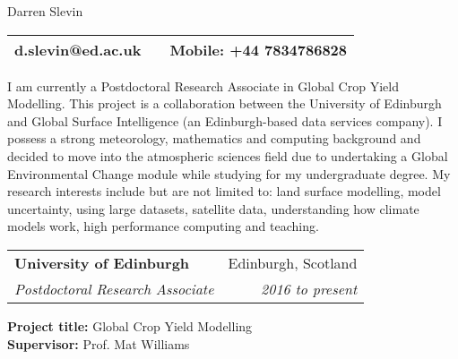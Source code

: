 \documentclass[11pt]{article}
\makeatletter
\newenvironment{newparagraph}{\par\setlength{\rightskip}{3cm}}
\newcommand{\resumeSection}[1]{
    \par
    \vspace{\baselineskip}
    \large {\sc {#1}}
    \par
    \vspace{-0.9\baselineskip}
    \hrulefill
    \vspace{0.5\baselineskip}
    \par
}
\newenvironment{resumeSubSectionHeader}{
    \par
    \begin{tabular*}{\textwidth}{l@{\extracolsep{\fill}}r}
    \par
} {
    \end{tabular*}
    \par
}
\newenvironment{resumeSubSectionBody}{
    \par
    \vspace{-0.8\parskip}
    \begin{small}
    \par
} {
    \par
    \end{small}
    \par
}
\makeatother
\begin{document}


%
%
\begin{center}
    { \huge \textbf \sc Darren Slevin}

\begin{tabular*}{\textwidth}{@{\extracolsep{\fill}}lcr}
    d.slevin@ed.ac.uk & & Mobile: +44 7834786828\\
    \hline\hline
\end{tabular*}
\end{center}



I am currently a Postdoctoral Research Associate in Global Crop Yield Modelling. This project is a collaboration between the University of Edinburgh and Global Surface Intelligence (an Edinburgh-based data services 
company). I possess a strong meteorology, 
mathematics and computing background and decided to move into the atmospheric sciences field due to 
undertaking a Global Environmental Change module while studying for my undergraduate 
degree. My research interests include but are not limited to: land surface modelling, 
model uncertainty, using large datasets, satellite data, understanding how climate 
models work, high performance computing and teaching. 


%
%
\begin{resumeSubSectionHeader}

	\textbf{University of Edinburgh} & Edinburgh, Scotland \\
	 \emph{Postdoctoral Research Associate} & \emph{2016 to present} \\ 

\end{resumeSubSectionHeader}
\begin{resumeSubSectionBody}
	
	\textbf{Project title:} Global Crop Yield Modelling\\
	\textbf{Supervisor:} Prof. Mat Williams


\end{resumeSubSectionBody}
\end{document}
